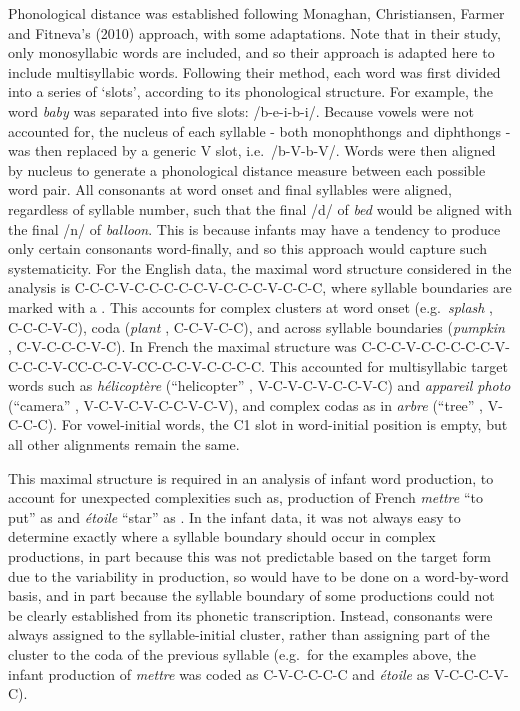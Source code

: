\documentclass[
  man,floatsintext]{apa6}
\begin{document}
Phonological distance was established following Monaghan, Christiansen, Farmer and Fitneva's (2010) approach, with some adaptations. Note that in their study, only monosyllabic words are included, and so their approach is adapted here to include multisyllabic words. Following their method, each word was first divided into a series of `slots', according to its phonological structure. For example, the word \emph{baby} was separated into five slots: /b-e-i-b-i/. Because vowels were not accounted for, the nucleus of each syllable - both monophthongs and diphthongs - was then replaced by a generic V slot, i.e.~/b-V-b-V/. Words were then aligned by nucleus to generate a phonological distance measure between each possible word pair. All consonants at word onset and final syllables were aligned, regardless of syllable number, such that the final /d/ of \emph{bed} would be aligned with the final /n/ of \emph{balloon}. This is because infants may have a tendency to produce only certain consonants word-finally, and so this approach would capture such systematicity. For the English data, the maximal word structure considered in the analysis is C-C-C-V-C-C-\textbar C-C-C-V-\textbar C-C-C-V-\textbar C-C-C, where syllable boundaries are marked with a \textbar. This accounts for complex clusters at word onset (e.g.~\emph{splash} , C-C-C-V-C), coda (\emph{plant} , C-C-V-C-C), and across syllable boundaries (\emph{pumpkin} , C-V-C-C-\textbar C-V-C). In French the maximal structure was C-C-C-V-C-C-\textbar C-C-C-V-\textbar C-C-C-V-C\textbar C-C-C-V-C\textbar C-C-C-V-\textbar C-C-C-C. This accounted for multisyllabic target words such as \emph{hélicoptère} (``helicopter'' , V-\textbar C-V-\textbar C-V-C-\textbar C-V-C) and \emph{appareil photo} (``camera'' , V-\textbar C-V-\textbar C-V-C-\textbar C-V-\textbar C-V), and complex codas as in \emph{arbre} (``tree'' , V-C-\textbar C-C). For vowel-initial words, the C1 slot in word-initial position is empty, but all other alignments remain the same.

This maximal structure is required in an analysis of infant word production, to account for unexpected complexities such as, production of French \emph{mettre} ``to put'' as \textipa{[mEKstK]} and \emph{étoile} ``star'' as \textipa{[Estwal]}. In the infant data, it was not always easy to determine exactly where a syllable boundary should occur in complex productions, in part because this was not predictable based on the target form due to the variability in production, so would have to be done on a word-by-word basis, and in part because the syllable boundary of some productions could not be clearly established from its phonetic transcription. Instead, consonants were always assigned to the syllable-initial cluster, rather than assigning part of the cluster to the coda of the previous syllable (e.g.~for the examples above, the infant production of \emph{mettre} was coded as C-V-\textbar C-C-C-C and \emph{étoile} as V-\textbar C-C-C-V-C).
\end{document}
